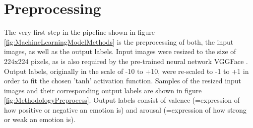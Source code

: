 \section{Preprocessing}
The very first step in the pipeline shown in figure \ref{fig:MachineLearningModelMethods} is the preprocessing of both, the input images, as well as the output labels. Input images were resized to the size of 224x224 pixels, as is also required by the pre-trained neural network VGGFace \citep{Cao:2018:VGGFace2}. Output labels, originally in the scale of -10 to +10, were re-scaled to -1 to +1 in order to fit the chosen 'tanh' activation function.
\newline\newline
Samples of the resized input images and their corresponding output labels are shown in figure \ref{fig:MethodologyPreprocess}. Output labels consist of valence (=expression of how positive or negative an emotion is) and arousal (=expression of how strong or weak an emotion is).

